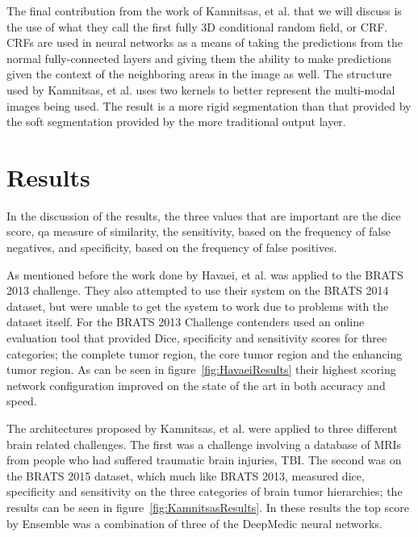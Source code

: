 \documentclass{sig-alternate}
\begin{document}
The final contribution from the work of Kamnitsas, et al. that we will discuss is the use of what they call the first fully 3D conditional random field, or CRF. CRFs are used in neural networks as a means of taking the predictions from the normal fully-connected layers and giving them the ability to make predictions given the context of the neighboring areas in the image as well. The structure used by Kamnitsas, et al. uses two kernels to better represent the multi-modal images being used. The result is a more rigid segmentation than that provided by the soft segmentation provided by the more traditional output layer.


\section{Results}
\label{sec:results}
In the discussion of the results, the three values that are important are the dice score, qa measure of similarity, the sensitivity, based on the frequency of false negatives, and specificity, based on the frequency of false positives.

As mentioned before the work done by Havaei, et al. was applied to the BRATS 2013 challenge. They also attempted to use their system on the BRATS 2014 dataset, but were unable to get the system to work due to problems with the dataset itself. For the BRATS 2013 Challenge contenders used an online evaluation tool that provided Dice, specificity and sensitivity scores for three categories; the complete tumor region, the core tumor region and the enhancing tumor region. As can be seen in figure~\ref{fig:HavaeiResults} their highest scoring network configuration improved on the state of the art in both accuracy and speed.

\begin{figure*}
\centering
{}
\caption{Havaei, et al. best performnce versus previous state-of-the-arts~\cite{Havaei:2017}.}
\label{fig:HavaeiResults}
\end{figure*}

The architectures proposed by Kamnitsas, et al. were applied to three different brain related challenges. The first was a challenge involving a database of MRIs from people who had suffered traumatic brain injuries, TBI. The second was on the BRATS 2015 dataset, which much like BRATS 2013, measured dice, specificity and sensitivity on the three categories of brain tumor hierarchies; the results can be seen in figure~\ref{fig:KamnitsasResults}. In these results the top score by Ensemble was a combination of three of the DeepMedic neural networks.
\end{document}
